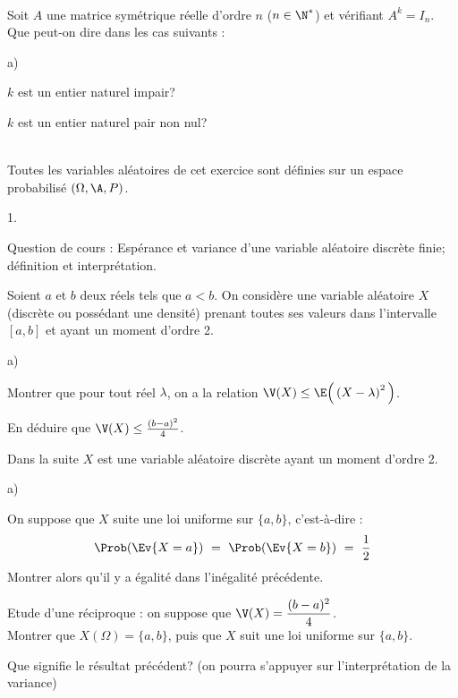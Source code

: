 \documentclass[11pt]{article}%
\begin{document}
\begin{exerciceSP}~\\
  Soit $A$ une matrice symétrique réelle d'ordre $n$ ($n \in \N^*$) et
  vérifiant $A^k = I_n$. \\
  Que peut-on dire dans les cas suivants : 
  \begin{noliste}{a)}
    \setlength{\itemsep}{2mm}
  \item $k$ est un entier naturel impair?
  \item $k$ est un entier naturel pair non nul?
  \end{noliste}
\end{exerciceSP}


\newpage


\begin{exerciceAP}~\\
  Toutes les variables aléatoires de cet exercice sont définies sur un
  espace probabilisé $(\Omega , \A , P)$.
  \begin{noliste}{1.}
    \setlength{\itemsep}{2mm}
  \item Question de cours : Espérance et variance d'une variable
    aléatoire discrète finie; définition et interprétation.
  \item Soient $a$ et $b$ deux réels tels que $a < b$. On considère
    une variable aléatoire $X$ (discrète ou possédant une densité)
    prenant toutes ses valeurs dans l'intervalle $[a, b]$ et ayant un
    moment d'ordre 2.
    \begin{noliste}{a)}
    \setlength{\itemsep}{2mm} 
  \item Montrer que pour tout réel $\lambda$, on a la relation $\V(X)
    \leq \E\Big( \left(X - \lambda\right)^2 \Big)$.
    \item En déduire que $\V(X) \leq \frac{(b-a)^2}{4}$.
    \end{noliste}
  \item Dans la suite $X$ est une variable aléatoire discrète ayant un
    moment d'ordre 2.
    \begin{noliste}{a)}
    \setlength{\itemsep}{2mm} 
  \item On suppose que $X$ suite une loi uniforme sur $\{ a, b \}$,
    c'est-à-dire :
      \[
      \Prob(\Ev{X=a}) \ = \ \Prob(\Ev{X=b} ) \ = \ \frac{1}{2}
      \]
      Montrer alors qu'il y a égalité dans l'inégalité précédente.
    \item Etude d'une réciproque : on suppose que $\V(X) =
      \dfrac{(b-a)^2}{4}$.\\
      Montrer que $X(\Omega) = \{ a, b \}$, puis que $X$ suit une loi
      uniforme sur $\{ a, b \}$.
    \end{noliste}
  \item Que signifie le résultat précédent? (on pourra s'appuyer sur
    l'interprétation de la variance)
  \end{noliste}
\end{exerciceAP}
\end{document}
